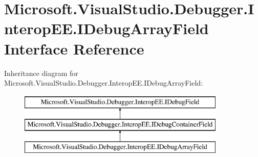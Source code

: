 \hypertarget{interface_microsoft_1_1_visual_studio_1_1_debugger_1_1_interop_e_e_1_1_i_debug_array_field}{\section{Microsoft.\+Visual\+Studio.\+Debugger.\+Interop\+E\+E.\+I\+Debug\+Array\+Field Interface Reference}
\label{interface_microsoft_1_1_visual_studio_1_1_debugger_1_1_interop_e_e_1_1_i_debug_array_field}
}
Inheritance diagram for Microsoft.\+Visual\+Studio.\+Debugger.\+Interop\+E\+E.\+I\+Debug\+Array\+Field\+:\begin{figure}[H]
\begin{center}
\leavevmode
\includegraphics[height=3.000000cm]{interface_microsoft_1_1_visual_studio_1_1_debugger_1_1_interop_e_e_1_1_i_debug_array_field}
\end{center}
\end{figure}
